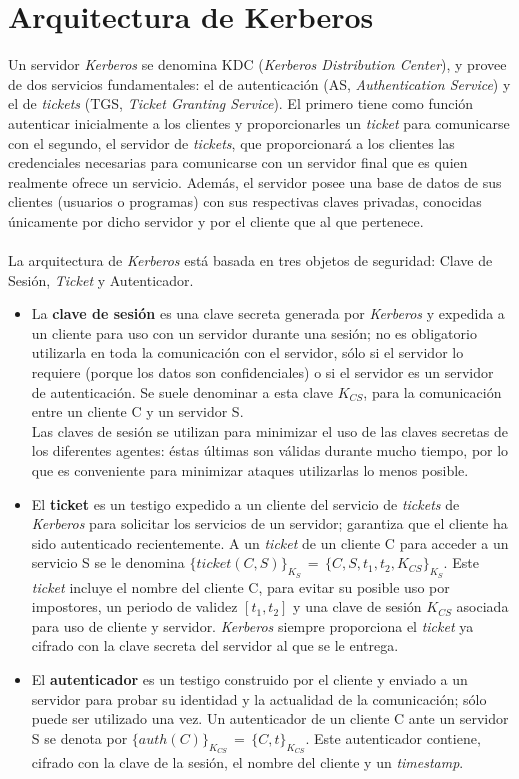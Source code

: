 \section{Arquitectura de Kerberos}
Un servidor {\it Kerberos} se denomina KDC ({\it Kerberos Distribution Center}),
y provee de dos servicios fundamentales: el de autenticaci\'on (AS, {\it 
Authentication Service}) y el de {\it tickets} (TGS, {\it Ticket Granting 
Service}). El primero tiene como funci\'on autenticar inicialmente a los 
clientes y proporcionarles un {\it ticket} para comunicarse con el segundo, 
el servidor de {\it tickets}, que proporcionar\'a a los clientes las 
credenciales necesarias para comunicarse con un servidor final que es quien
realmente ofrece un servicio. Adem\'as, el servidor posee una base de datos de
sus clientes (usuarios o programas) con sus respectivas claves privadas, 
conocidas \'unicamente por dicho servidor y por el cliente que al que 
pertenece.\\
\\La arquitectura de {\it Kerberos} est\'a basada en tres objetos de seguridad:
Clave de Sesi\'on, {\it Ticket} y Autenticador.
\begin{itemize}
\item{}
La {\bf clave de sesi\'on} es una clave secreta generada por {\it Kerberos} y
expedida a un cliente para uso con un servidor durante una sesi\'on; no es
obligatorio utilizarla en toda la comunicaci\'on con el servidor, s\'olo si el
servidor lo requiere (porque los datos son confidenciales) o si el servidor es
un servidor de autenticaci\'on. Se suele denominar a esta clave $K_{CS}$,
para la comunicaci\'on entre un cliente C y un servidor S.\\
Las claves de sesi\'on se utilizan para minimizar el uso de las claves secretas
de los diferentes agentes: \'estas \'ultimas son v\'alidas durante mucho
tiempo, por lo que es conveniente para minimizar ataques utilizarlas lo menos 
posible.
\item{}
El {\bf ticket} es un testigo expedido a un cliente del servicio de {\it
tickets} de {\it Kerberos} para solicitar
los servicios de un servidor; garantiza que el cliente ha sido autenticado
recientemente. A un {\it ticket} de un cliente C para acceder a un servicio S
se le denomina
$\{ticket(C,S)\}_{K_{S}}\, =\, \{C, S, t_{1}, t_{2}, K_{CS}\}_{K_{S}}$.
Este {\it ticket} incluye el nombre del cliente C, para evitar su posible uso
por impostores, un periodo de validez $[t_{1},t_{2}]$ y una clave de sesi\'on
$K_{CS}$ asociada para uso de cliente y servidor. {\it Kerberos} siempre
proporciona el {\it ticket} ya cifrado con la clave secreta del servidor al que
se le entrega.
\item{}
El {\bf autenticador} es un testigo construido por el cliente y enviado a un
servidor para probar su identidad y la actualidad de la comunicaci\'on; s\'olo
puede ser utilizado una vez. Un autenticador de un cliente C ante un servidor S
se denota por $\{auth(C)\}_{K_{CS}}\, = \, \{C,t\}_{K_{CS}}$.
Este autenticador contiene, cifrado con la clave de la sesi\'on, el nombre del
cliente y un {\it timestamp}.\\
\end{itemize}
